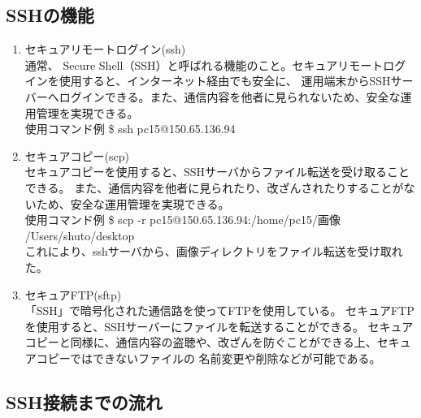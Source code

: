 \documentclass[11pt,a4j,titlepage]{jreport}
\begin{document}
\subsection{SSHの機能}



\begin{enumerate}
    \item セキュアリモートログイン(ssh)\mbox{}\\通常、
    Secure Shell（SSH）と呼ばれる機能のこと。セキュアリモートログインを使用すると、インターネット経由でも安全に、
    運用端末からSSHサーバーへログインできる。また、通信内容を他者に見られないため、安全な運用管理を実現できる。
    \\使用コマンド例   \$ ssh pc15@150.65.136.94

    \item セキュアコピー(scp)\mbox{}\\セキュアコピーを使用すると、SSHサーバからファイル転送を受け取ることできる。
    また、通信内容を他者に見られたり、改ざんされたりすることがないため、安全な運用管理を実現できる。
    \\使用コマンド例   \$ scp -r pc15@150.65.136.94:/home/pc15/画像 /Users/shuto/desktop\\
    これにより、sshサーバから、画像ディレクトリをファイル転送を受け取れた。

    \item セキュアFTP(sftp)\mbox{}\\
    「SSH」で暗号化された通信路を使ってFTPを使用している。
    セキュアFTPを使用すると、SSHサーバーにファイルを転送することができる。
    セキュアコピーと同様に、通信内容の盗聴や、改ざんを防ぐことができる上、セキュアコピーではできないファイルの
    名前変更や削除などが可能である。
    
\end{enumerate}



\subsection{SSH接続までの流れ}
\end{document}
